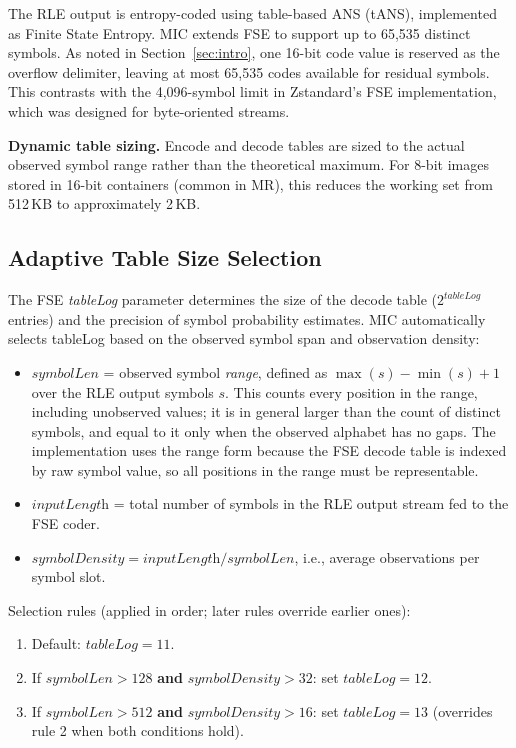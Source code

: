 \documentclass[journal]{IEEEtran}
\begin{document}
The RLE output is entropy-coded using table-based ANS (tANS), implemented as
Finite State Entropy. MIC extends FSE to support up to 65,535 distinct symbols.
As noted in Section~\ref{sec:intro}, one 16-bit code value is reserved as the
overflow delimiter, leaving at most 65,535 codes available for residual symbols.
This contrasts with the 4,096-symbol limit in Zstandard's FSE implementation,
which was designed for byte-oriented streams.

\textbf{Dynamic table sizing.} Encode and decode tables are sized to the actual
observed symbol range rather than the theoretical maximum. For 8-bit
images stored in 16-bit containers (common in MR), this reduces the working set
from 512\,KB to approximately 2\,KB.

\subsection{Adaptive Table Size Selection}

The FSE \emph{tableLog} parameter determines the size of the decode table
($2^{\textit{tableLog}}$ entries) and the precision of symbol probability
estimates. MIC automatically selects tableLog based on the observed symbol
span and observation density:
\begin{itemize}
  \item $\textit{symbolLen}$ = observed symbol \emph{range}, defined as
  $\max(s) - \min(s) + 1$ over the RLE output symbols $s$. This counts every
  position in the range, including unobserved values; it is in general
  larger than the count of distinct symbols, and equal to it only when the
  observed alphabet has no gaps. The implementation uses the range form
  because the FSE decode table is indexed by raw symbol value, so all
  positions in the range must be representable.
  \item $\textit{inputLength}$ = total number of symbols in the RLE output
  stream fed to the FSE coder.
  \item $\textit{symbolDensity} = \textit{inputLength} / \textit{symbolLen}$,
  i.e., average observations per symbol slot.
\end{itemize}

Selection rules (applied in order; later rules override earlier ones):
\begin{enumerate}
  \item Default: $\textit{tableLog} = 11$.
  \item If $\textit{symbolLen} > 128$ \textbf{and} $\textit{symbolDensity} > 32$:
  set $\textit{tableLog} = 12$.
  \item If $\textit{symbolLen} > 512$ \textbf{and} $\textit{symbolDensity} > 16$:
  set $\textit{tableLog} = 13$ (overrides rule 2 when both conditions hold).
\end{enumerate}
\end{document}
